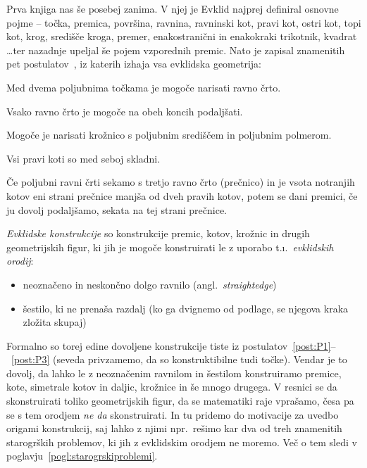 Prva knjiga nas še posebej zanima. V njej je Evklid najprej definiral osnovne pojme -- točka, premica, površina, ravnina, ravninski kot, pravi kot, ostri kot, topi kot, krog, središče kroga, premer, enakostranični in enakokraki trikotnik, kvadrat \ldots ter nazadnje upeljal še pojem vzporednih premic. Nato je zapisal znamenitih pet postulatov~\cite{euclidI}, iz katerih izhaja vsa evklidska geometrija:

\renewcommand{\thepostulat}{P\arabic{postulat}}

\begin{postulat}
    \label{post:P1}
    Med dvema poljubnima točkama je mogoče narisati ravno črto.
\end{postulat}
\begin{postulat}
    \label{post:P2}
    Vsako ravno črto je mogoče na obeh koncih podaljšati.
\end{postulat}
\begin{postulat}
    \label{post:P3}
    Mogoče je narisati krožnico s poljubnim središčem in poljubnim polmerom.
\end{postulat}
\begin{postulat}
    \label{post:P4}
    Vsi pravi koti so med seboj skladni.
\end{postulat}
\begin{postulat}
    \label{post:P5}
    Če poljubni ravni črti sekamo s tretjo ravno črto (prečnico) in je vsota notranjih kotov eni strani prečnice manjša od dveh pravih kotov, potem se dani premici, če ju dovolj podaljšamo, sekata na tej strani prečnice.
\end{postulat}

\emph{Evklidske konstrukcije} so konstrukcije premic, kotov, krožnic in drugih geometrijskih figur, ki jih je mogoče konstruirati le z uporabo t.\i.\ \emph{evklidskih orodij}:

\begin{itemize}
    \item neoznačeno in neskončno dolgo ravnilo (angl.\ \emph{straightedge})
    \item šestilo, ki ne prenaša razdalj (ko ga dvignemo od podlage, se njegova kraka zložita skupaj)
\end{itemize}

Formalno so torej edine dovoljene konstrukcije tiste iz postulatov~\ref{post:P1}--~\ref{post:P3} (seveda privzamemo, da so konstruktibilne tudi točke). Vendar je to dovolj, da lahko le z neoznačenim ravnilom in šestilom konstruiramo premice, kote, simetrale kotov in daljic, krožnice in še mnogo drugega. V resnici se da skonstruirati toliko geometrijskih figur, da se matematiki raje vprašamo, česa pa se s tem orodjem \emph{ne da} skonstruirati. In tu pridemo do motivacije za uvedbo origami konstrukcij, saj lahko z njimi npr.\ rešimo kar dva od treh znamenitih starogrških problemov, ki jih z evklidskim orodjem ne moremo. Več o tem sledi v poglavju~\ref{pogl:starogrskiproblemi}.

